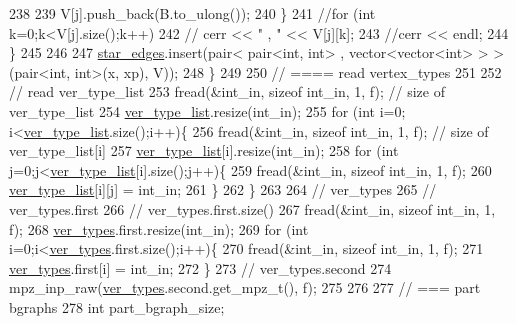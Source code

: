 \begin{DoxyCode}
238 
239         V[j].push\_back(B.to\_ulong());
240       \}
241       \textcolor{comment}{//for (int k=0;k<V[j].size();k++)}
242       \textcolor{comment}{//  cerr << " , " << V[j][k];}
243       \textcolor{comment}{//cerr << endl;}
244     \}
245 
246 
247     \hyperlink{classmarked__graph__compressed_a7df5779d313486644132bd816937f532}{star\_edges}.insert(pair< pair<int, int> , vector<vector<int> > > (pair<int, int>(x, xp), V));
248   \}
249 
250   \textcolor{comment}{// ==== read vertex\_types}
251 
252   \textcolor{comment}{// read ver\_type\_list}
253   fread(&int\_in, \textcolor{keyword}{sizeof} int\_in, 1, f); \textcolor{comment}{// size of ver\_type\_list}
254   \hyperlink{classmarked__graph__compressed_af2e3e55223d436628a02758dfae88493}{ver\_type\_list}.resize(int\_in);
255   \textcolor{keywordflow}{for} (\textcolor{keywordtype}{int} i=0; i<\hyperlink{classmarked__graph__compressed_af2e3e55223d436628a02758dfae88493}{ver\_type\_list}.size();i++)\{
256     fread(&int\_in, \textcolor{keyword}{sizeof} int\_in, 1, f); \textcolor{comment}{// size of ver\_type\_list[i]}
257     \hyperlink{classmarked__graph__compressed_af2e3e55223d436628a02758dfae88493}{ver\_type\_list}[i].resize(int\_in);
258     \textcolor{keywordflow}{for} (\textcolor{keywordtype}{int} j=0;j<\hyperlink{classmarked__graph__compressed_af2e3e55223d436628a02758dfae88493}{ver\_type\_list}[i].size();j++)\{
259       fread(&int\_in, \textcolor{keyword}{sizeof} int\_in, 1, f);
260       \hyperlink{classmarked__graph__compressed_af2e3e55223d436628a02758dfae88493}{ver\_type\_list}[i][j] = int\_in;
261     \}
262   \}
263 
264   \textcolor{comment}{// ver\_types}
265   \textcolor{comment}{// ver\_types.first}
266   \textcolor{comment}{// ver\_types.first.size()}
267   fread(&int\_in, \textcolor{keyword}{sizeof} int\_in, 1, f);
268   \hyperlink{classmarked__graph__compressed_af446cc5e23c241a92b76642fd5ebc403}{ver\_types}.first.resize(int\_in);
269   \textcolor{keywordflow}{for} (\textcolor{keywordtype}{int} i=0;i<\hyperlink{classmarked__graph__compressed_af446cc5e23c241a92b76642fd5ebc403}{ver\_types}.first.size();i++)\{
270     fread(&int\_in, \textcolor{keyword}{sizeof} int\_in, 1, f);
271     \hyperlink{classmarked__graph__compressed_af446cc5e23c241a92b76642fd5ebc403}{ver\_types}.first[i] = int\_in;
272   \}
273   \textcolor{comment}{// ver\_types.second}
274   mpz\_inp\_raw(\hyperlink{classmarked__graph__compressed_af446cc5e23c241a92b76642fd5ebc403}{ver\_types}.second.get\_mpz\_t(), f);
275 
276 
277   \textcolor{comment}{// === part bgraphs}
278   \textcolor{keywordtype}{int} part\_bgraph\_size;

\end{DoxyCode}

